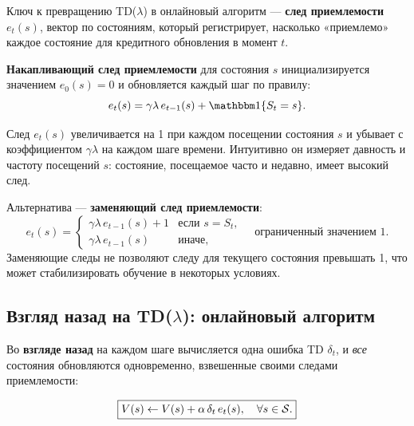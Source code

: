 Ключ к превращению TD($\lambda$) в онлайновый алгоритм --- \textbf{след приемлемости} $e_t(s)$, вектор по состояниям, который регистрирует, насколько «приемлемо» каждое состояние для кредитного обновления в момент $t$.

\begin{definition}
\label{def:elig-trace}
\textbf{Накапливающий след приемлемости} для состояния $s$ инициализируется значением $e_0(s)=0$ и обновляется каждый шаг по правилу:
\begin{equation}
\label{eq:elig-trace}
e_t(s) = \gamma\lambda\, e_{t-1}(s) + \ind\{S_t = s\}.
\end{equation}
\end{definition}

След $e_t(s)$ увеличивается на 1 при каждом посещении состояния $s$ и убывает с коэффициентом $\gamma\lambda$ на каждом шаге времени.  Интуитивно он измеряет давность и частоту посещений $s$: состояние, посещаемое часто и недавно, имеет высокий след.

Альтернатива --- \textbf{заменяющий след приемлемости}:
\begin{equation}
\label{eq:elig-trace-replacing}
e_t(s) = \begin{cases} \gamma\lambda\, e_{t-1}(s) + 1 & \mbox{если } s = S_t,\\ \gamma\lambda\, e_{t-1}(s) & \mbox{иначе,}\end{cases}
\quad\mbox{ограниченный значением 1.}
\end{equation}
Заменяющие следы не позволяют следу для текущего состояния превышать 1, что может стабилизировать обучение в некоторых условиях.

\subsection{Взгляд назад на TD($\lambda$): онлайновый алгоритм}
\label{subsec:backward-view}

Во \textbf{взгляде назад} на каждом шаге вычисляется одна ошибка TD $\delta_t$, и \emph{все} состояния обновляются одновременно, взвешенные своими следами приемлемости:

\begin{equation}
\label{eq:td-lambda-update}
\boxed{V(s) \leftarrow V(s) + \alpha\,\delta_t\,e_t(s), \quad \forall s\in\mathcal{S}.}
\end{equation}

